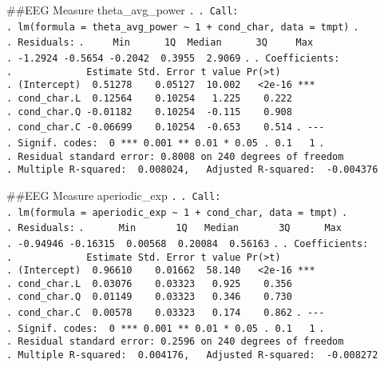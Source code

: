 \documentclass[
]{article}
\begin{document}
\#\#EEG Measure theta\_avg\_power \texttt{.} \texttt{.\ Call:}
\texttt{.\ lm(formula\ =\ theta\_avg\_power\ \textasciitilde{}\ 1\ +\ cond\_char,\ data\ =\ tmpt)}
\texttt{.} \texttt{.\ Residuals:}
\texttt{.\ \ \ \ \ Min\ \ \ \ \ \ 1Q\ \ Median\ \ \ \ \ \ 3Q\ \ \ \ \ Max}
\texttt{.\ -1.2924\ -0.5654\ -0.2042\ \ 0.3955\ \ 2.9069} \texttt{.}
\texttt{.\ Coefficients:}
\texttt{.\ \ \ \ \ \ \ \ \ \ \ \ \ Estimate\ Std.\ Error\ t\ value\ Pr(\textgreater{}\textbar{}t\textbar{})}
\texttt{.\ (Intercept)\ \ 0.51278\ \ \ \ 0.05127\ \ 10.002\ \ \ \textless{}2e-16\ ***}
\texttt{.\ cond\_char.L\ \ 0.12564\ \ \ \ 0.10254\ \ \ 1.225\ \ \ \ 0.222}
\texttt{.\ cond\_char.Q\ -0.01182\ \ \ \ 0.10254\ \ -0.115\ \ \ \ 0.908}
\texttt{.\ cond\_char.C\ -0.06699\ \ \ \ 0.10254\ \ -0.653\ \ \ \ 0.514}
\texttt{.\ -\/-\/-}
\texttt{.\ Signif.\ codes:\ \ 0\ \textquotesingle{}***\textquotesingle{}\ 0.001\ \textquotesingle{}**\textquotesingle{}\ 0.01\ \textquotesingle{}*\textquotesingle{}\ 0.05\ \textquotesingle{}.\textquotesingle{}\ 0.1\ \textquotesingle{}\ \textquotesingle{}\ 1}
\texttt{.}
\texttt{.\ Residual\ standard\ error:\ 0.8008\ on\ 240\ degrees\ of\ freedom}
\texttt{.\ Multiple\ R-squared:\ \ 0.008024,\ \ \ Adjusted\ R-squared:\ \ -0.004376}

\#\#EEG Measure aperiodic\_exp \texttt{.} \texttt{.\ Call:}
\texttt{.\ lm(formula\ =\ aperiodic\_exp\ \textasciitilde{}\ 1\ +\ cond\_char,\ data\ =\ tmpt)}
\texttt{.} \texttt{.\ Residuals:}
\texttt{.\ \ \ \ \ \ Min\ \ \ \ \ \ \ 1Q\ \ \ Median\ \ \ \ \ \ \ 3Q\ \ \ \ \ \ Max}
\texttt{.\ -0.94946\ -0.16315\ \ 0.00568\ \ 0.20084\ \ 0.56163}
\texttt{.} \texttt{.\ Coefficients:}
\texttt{.\ \ \ \ \ \ \ \ \ \ \ \ \ Estimate\ Std.\ Error\ t\ value\ Pr(\textgreater{}\textbar{}t\textbar{})}
\texttt{.\ (Intercept)\ \ 0.96610\ \ \ \ 0.01662\ \ 58.140\ \ \ \textless{}2e-16\ ***}
\texttt{.\ cond\_char.L\ \ 0.03076\ \ \ \ 0.03323\ \ \ 0.925\ \ \ \ 0.356}
\texttt{.\ cond\_char.Q\ \ 0.01149\ \ \ \ 0.03323\ \ \ 0.346\ \ \ \ 0.730}
\texttt{.\ cond\_char.C\ \ 0.00578\ \ \ \ 0.03323\ \ \ 0.174\ \ \ \ 0.862}
\texttt{.\ -\/-\/-}
\texttt{.\ Signif.\ codes:\ \ 0\ \textquotesingle{}***\textquotesingle{}\ 0.001\ \textquotesingle{}**\textquotesingle{}\ 0.01\ \textquotesingle{}*\textquotesingle{}\ 0.05\ \textquotesingle{}.\textquotesingle{}\ 0.1\ \textquotesingle{}\ \textquotesingle{}\ 1}
\texttt{.}
\texttt{.\ Residual\ standard\ error:\ 0.2596\ on\ 240\ degrees\ of\ freedom}
\texttt{.\ Multiple\ R-squared:\ \ 0.004176,\ \ \ Adjusted\ R-squared:\ \ -0.008272}
\end{document}
